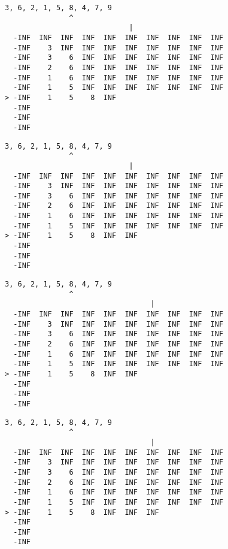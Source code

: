 { \begin{verbatim}
3, 6, 2, 1, 5, 8, 4, 7, 9
               ^
                             |
  -INF  INF  INF  INF  INF  INF  INF  INF  INF  INF
  -INF    3  INF  INF  INF  INF  INF  INF  INF  INF
  -INF    3    6  INF  INF  INF  INF  INF  INF  INF
  -INF    2    6  INF  INF  INF  INF  INF  INF  INF
  -INF    1    6  INF  INF  INF  INF  INF  INF  INF
  -INF    1    5  INF  INF  INF  INF  INF  INF  INF
> -INF    1    5    8  INF                         
  -INF                                             
  -INF                                             
  -INF                                             
\end{verbatim} }

{ \begin{verbatim}
3, 6, 2, 1, 5, 8, 4, 7, 9
               ^
                             |
  -INF  INF  INF  INF  INF  INF  INF  INF  INF  INF
  -INF    3  INF  INF  INF  INF  INF  INF  INF  INF
  -INF    3    6  INF  INF  INF  INF  INF  INF  INF
  -INF    2    6  INF  INF  INF  INF  INF  INF  INF
  -INF    1    6  INF  INF  INF  INF  INF  INF  INF
  -INF    1    5  INF  INF  INF  INF  INF  INF  INF
> -INF    1    5    8  INF  INF                    
  -INF                                             
  -INF                                             
  -INF                                             
\end{verbatim} }

{ \begin{verbatim}
3, 6, 2, 1, 5, 8, 4, 7, 9
               ^
                                  |
  -INF  INF  INF  INF  INF  INF  INF  INF  INF  INF
  -INF    3  INF  INF  INF  INF  INF  INF  INF  INF
  -INF    3    6  INF  INF  INF  INF  INF  INF  INF
  -INF    2    6  INF  INF  INF  INF  INF  INF  INF
  -INF    1    6  INF  INF  INF  INF  INF  INF  INF
  -INF    1    5  INF  INF  INF  INF  INF  INF  INF
> -INF    1    5    8  INF  INF                    
  -INF                                             
  -INF                                             
  -INF                                             
\end{verbatim} }

{ \begin{verbatim}
3, 6, 2, 1, 5, 8, 4, 7, 9
               ^
                                  |
  -INF  INF  INF  INF  INF  INF  INF  INF  INF  INF
  -INF    3  INF  INF  INF  INF  INF  INF  INF  INF
  -INF    3    6  INF  INF  INF  INF  INF  INF  INF
  -INF    2    6  INF  INF  INF  INF  INF  INF  INF
  -INF    1    6  INF  INF  INF  INF  INF  INF  INF
  -INF    1    5  INF  INF  INF  INF  INF  INF  INF
> -INF    1    5    8  INF  INF  INF               
  -INF                                             
  -INF                                             
  -INF                                             
\end{verbatim} }

